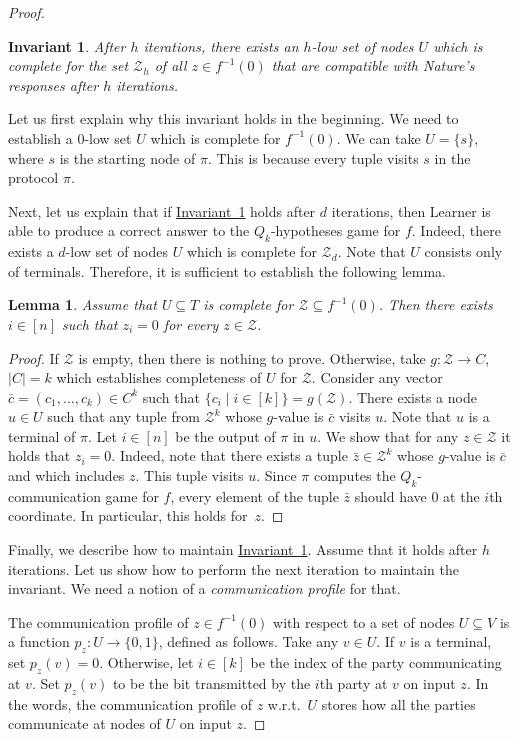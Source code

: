 \documentclass[11pt]{article}
\numberwithin{equation}{section}
\newtheorem{lemma}[theorem]{Lemma}
\theoremstyle{definition}
\theoremstyle{plain}
\newcommand{\expref}[2]{\hyperref[#2]{#1~\ref{#2}}}
\newtheorem{invariant}[theorem]{Invariant}
\begin{document}
\begin{proof}
\begin{invariant}
\label{invar1}
After $h$ iterations, there exists an $h$-low set of nodes $U$ which is complete for the set $\mathcal{Z}_h$ of all $z\in f^{-1}(0)$ that are compatible with Nature's responses after $h$ iterations.
\end{invariant}
Let us first explain why this invariant holds in the beginning. We need to establish a $0$-low set $U$ which is complete for $f^{-1}(0)$. We can take $U = \{s\}$, where $s$ is the starting node of $\pi$. This is because every tuple visits $s$ in the protocol $\pi$.

Next, let us explain that if \expref{Invariant}{invar1} holds after $d$ iterations, then Learner is able to produce a correct answer to the $Q_k$-hypotheses game for $f$. Indeed, there exists a $d$-low set of nodes $U$ which is complete for $\mathcal{Z}_d$. Note that $U$ consists only of terminals. Therefore, it is sufficient to establish the following lemma.

\begin{lemma}
\label{complete_lemma}
Assume that $U\subseteq T$ is complete for $\mathcal{Z} \subseteq f^{-1}(0)$. Then there exists $i\in [n]$ such that $z_i = 0$ for every $z\in\mathcal{Z}$.
\end{lemma}
\begin{proof}
If $\mathcal{Z}$ is empty, then there is nothing to prove. Otherwise, take $g\colon\mathcal{Z} \to C$, $|C| = k$ which establishes completeness of $U$ for $\mathcal{Z}$.  Consider any vector $\bar{c} = (c_1, \ldots, c_k) \in C^k$  such that $\{ c_i \mid i\in [k]\} = g(\mathcal{Z})$. There exists a node $u\in U$ such that any tuple from $\mathcal{Z}^k$  whose $g$-value is $\bar{c}$ visits $u$. Note that $u$ is a terminal of $\pi$. Let $i\in[n]$ be the output of $\pi$ in $u$. We show that for any $z\in\mathcal{Z}$ it holds that $z_i = 0$. Indeed, note that there exists a tuple  $\bar{z}\in\mathcal{Z}^k$  whose $g$-value is $\bar{c}$ and which includes $z$.  This tuple visits $u$. Since $\pi$ computes the $Q_k$-communication game for $f$, every element of the tuple $\bar{z}$ should have $0$ at the $i$th coordinate. In particular, this holds for~$z$.
\end{proof}
Finally, we describe how to maintain \expref{Invariant}{invar1}.
Assume that it holds after $h$ iterations. Let us show how to perform the next iteration to maintain the invariant. We need a notion of a \emph{communication profile} for that.

The communication profile of $z\in f^{-1}(0)$ with respect to a set of nodes $U\subseteq V$ is a function $p_z\colon U \to \{0, 1\}$, defined as follows. Take any $v\in U$. If $v$ is a terminal, set $p_z(v) = 0$. Otherwise, let $i\in [k]$ be the index of the party communicating at $v$. Set $p_z(v)$ to be the bit transmitted by the $i$th party at $v$ on input $z$. In the words, the communication profile of $z$ w.r.t.~$U$ stores how all the parties communicate at nodes of $U$ on input $z$.


\end{proof}
\end{document}
